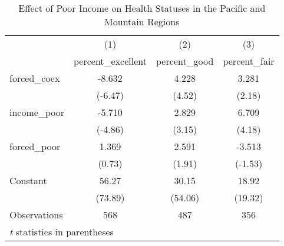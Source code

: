 \documentclass[12pt]{article}
\begin{document}
\begin{table}[htbp]\centering \caption{Effect of Poor Income on Health Statuses in the Pacific and Mountain Regions\label{pmpoor}} \begin{tabular}{l*{3}{c}} \toprule
                    &\multicolumn{1}{c}{(1)}&\multicolumn{1}{c}{(2)}&\multicolumn{1}{c}{(3)}\\
                    &\multicolumn{1}{c}{percent\_excellent}&\multicolumn{1}{c}{percent\_good}&\multicolumn{1}{c}{percent\_fair}\\
\midrule
forced\_coex         &      -8.632&       4.228&       3.281\\
                    &     (-6.47)&      (4.52)&      (2.18)\\
\addlinespace
income\_poor         &      -5.710&       2.829&       6.709\\
                    &     (-4.86)&      (3.15)&      (4.18)\\
\addlinespace
forced\_poor         &       1.369&       2.591&      -3.513\\
                    &      (0.73)&      (1.91)&     (-1.53)\\
\addlinespace
Constant            &       56.27&       30.15&       18.92\\
                    &     (73.89)&     (54.06)&     (19.32)\\
\midrule
Observations        &         568&         487&         356\\
\bottomrule
\multicolumn{4}{l}{\footnotesize \textit{t} statistics in parentheses}\\
\end{tabular}
\end{table}
\end{document}
